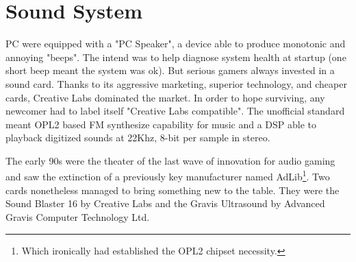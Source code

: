 \section{Sound System}
PC were equipped with a "PC Speaker", a device able to produce monotonic and annoying "beeps". The intend was to help diagnose system health at startup (one short beep meant the system was ok). But serious gamers always invested in a sound card. Thanks to its aggressive marketing, superior technology, and cheaper cards, Creative Labs dominated the market. In order to hope surviving, any newcomer had to label itself "Creative Labs compatible". The unofficial standard meant OPL2 based FM synthesize capability for music and a DSP able to playback digitized sounds at 22Khz, 8-bit per sample in stereo.\\
\par
 The early 90s were the theater of the last wave of innovation for audio gaming and saw the extinction of a previously key manufacturer named AdLib\footnote{Which ironically had established the OPL2 chipset necessity.}. Two cards nonetheless managed to bring something new to the table. They were the Sound Blaster 16 by Creative Labs and the Gravis Ultrasound by Advanced Gravis Computer Technology Ltd.\\

\vspace{-2mm}
